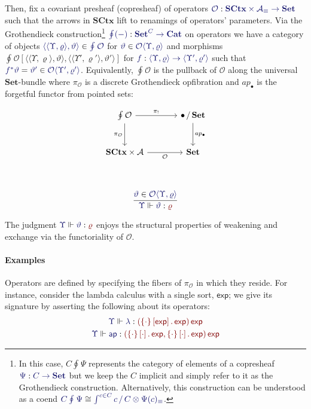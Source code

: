 \documentclass[11pt]{article}
\theoremstyle{definition}
\theoremstyle{remark}
\numberwithin{equation}{section}
\def\IModeColorName{MidnightBlue}
\def\OModeColorName{Maroon}
\newcommand\IMode[1]{{\color{\IModeColorName}{#1}}}
\newcommand\OMode[1]{{\color{\OModeColorName}{#1}}}
\newcommand\Member[2]{\IMode{#1}\in\IMode{#2}}
\newcommand\EqMember[3]{\IMode{#1}=\IMode{#2}\in\IMode{#3}}
\newcommand\Of[2]{\IMode{#1} : \IMode{#2}}
\newcommand\MkValence[3]{\left\{#1\right\}\left[#2\right].\, #3}
\newcommand\MkArity[2]{\left(#1\right) #2}
\newcommand\Arities{\mathcal{A}}
\newcommand\Operators{\mathcal{O}}
\newcommand\Cats{\mathbf{Cat}}
\newcommand\Discrete[1]{#1_{\equiv}}
\newcommand\Sets{\mathbf{Set}}
\newcommand\SCtx{\mathbf{SCtx}}
\newcommand\IsOperator[3]{\IMode{#1}\Vdash \IMode{#2} : \OMode{#3}}
\newcommand\Grothendieck[2]{\oint^{#1} #2#1}
\newcommand\Pair[2]{\langle #1, #2 \rangle}
\newcommand\Restriction[1]{#1^{*}}
\newcommand\Singleton{\bullet}
\newcommand\Coslice[2]{#1\, /\, #2}
\newcommand\SortExp{\mathsf{exp}}
\newcommand\Hom[3]{#1\left[#2,#3\right]}
\begin{document}
Then, fix a covariant presheaf (copresheaf) of operators
$\Of{\Operators}{\SCtx\times\Discrete{\Arities}\to\Sets}$ such that the arrows
in $\SCtx$ lift to renamings of operators' parameters. Via the Grothendieck
construction\footnote{In this case, $C\Grothendieck{}{\Psi}$ represents the
  category of elements of a copresheaf $\Of{\Psi}{C\to\Sets}$ but we keep the
  $C$ implicit and simply refer to it as the Grothendieck construction.
  Alternatively, this construction can be understood as a coend
$\IMode{C\Grothendieck{}{\Psi}}\cong \IMode{\int^{c \in C}\Coslice{c}{C}
\otimes \Discrete{\Psi(c)}}$.} $\Of{\Grothendieck{}{(-)}}{\Sets^{C}\to\Cats}$
on operators we have a category of objects
$\Member{\Pair{\Pair{\Upsilon}{\varrho}}{\vartheta}}{\Grothendieck{}{\Operators}}$
for $\Member{\vartheta}{\Operators\Pair{\Upsilon}{\varrho}}$ and morphisms
$\Hom{\Grothendieck{}{\Operators}}{\Pair{\Pair{\Upsilon}{\varrho}}{\vartheta}}{\Pair{\Pair{\Upsilon'}{\varrho'}}{\vartheta'}}$
for $\Of{f}{\Pair{\Upsilon}{\varrho}\to\Pair{\Upsilon'}{\varrho'}}$ such that
$\EqMember{\Restriction{f}\vartheta}{\vartheta'}{\Operators\Pair{\Upsilon'}{\varrho'}}$.
Equivalently, $\Grothendieck{}{\Operators}$ is the pullback of $\Operators$
along the universal $\Sets$-bundle where $\pi_{\Operators}$ is a discrete
Grothendieck opfibration and $ap_{\bullet}$ is the forgetful functor from
pointed sets:

\[
\begin{tikzcd}[ampersand replacement = \&, sep = large]
  {\Grothendieck{}{\Operators}}
    \arrow[r, "{\pi_{!}}"]
    \arrow[d, "{\pi_{\Operators}}" left]
  \& {\Coslice{\Singleton}{\Sets}}
    \arrow[d, "{ap_{\Singleton}}"] \\
  {\SCtx\times\Arities}
     \arrow[r, "{\Operators}" below]
  \& {\Sets} \\
\end{tikzcd}
\]

\[
  \infer{
    \IsOperator{\Upsilon}{\vartheta}{\varrho}
  }{
    \Member{\vartheta}{\Operators\langle\Upsilon,\varrho\rangle}
  }
\]

The judgment $\IsOperator{\Upsilon}{\vartheta}{\varrho}$ enjoys the structural
properties of weakening and exchange via the functoriality of
$\Operators$.

\paragraph{Examples}

Operators are defined by specifying the fibers of $\pi_{\Operators}$ in which
they reside. For instance, consider the lambda calculus with a single sort,
$\SortExp$; we give its signature by asserting the following about its
operators:
\begin{gather*}
  \IsOperator{\Upsilon}{\lambda}{
    \MkArity{\MkValence{\cdot}{\SortExp}{\SortExp}}{\SortExp}
  }\\
  \IsOperator{\Upsilon}{\mathsf{ap}}{
    \MkArity{
      \MkValence{\cdot}{\cdot}{\SortExp},
      \MkValence{\cdot}{\cdot}{\SortExp}
    }{\SortExp}
  }
\end{gather*}
\end{document}
